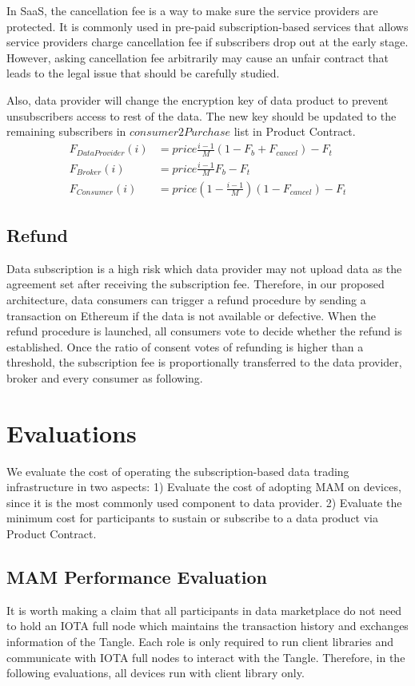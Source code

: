\documentclass[conference]{IEEEtran}
\begin{document}
In SaaS, the cancellation fee is a way to make sure the service providers are protected. It is commonly used in pre-paid subscription-based services that allows service providers charge cancellation fee if subscribers drop out at the early stage. However, asking cancellation fee arbitrarily may cause an unfair contract that leads to the legal issue that should be carefully studied.

Also, data provider will change the encryption key of data product to prevent unsubscribers access to rest of the data. The new key should be updated to the remaining subscribers in $consumer2Purchase$ list in Product Contract.
\begin{align}
\label{equation:unsubscribe}
    F_{DataProvider}(i) &= price \frac{i-1}{M} (1-F_{b}+F_{cancel}) -F_{t} \\
    F_{Broker}(i) &= price \frac{i-1}{M} F_{b} -F_{t} \\
    F_{Consumer}(i) &= price (1-\frac{i-1}{M})(1 -F_{cancel}) -F_{t}
\end{align}
\subsection{Refund}
\label{section:refund}
Data subscription is a high risk which data provider may not upload data as the agreement set after receiving the subscription fee. Therefore, in our proposed architecture, data consumers can trigger a refund procedure by sending a transaction on Ethereum if the data is not available or defective. When the refund procedure is launched, all consumers vote to decide whether the refund is established. Once the ratio of consent votes of refunding is higher than a threshold, the subscription fee is proportionally transferred to the data provider, broker and every consumer as following.

\section{Evaluations}
\label{section:evaluation}
We evaluate the cost of operating the subscription-based data trading infrastructure in two aspects: 1) Evaluate the cost of adopting MAM on devices, since it is the most commonly used component to data provider. 2) Evaluate the minimum cost for participants to sustain or subscribe to a data product via Product Contract.

\subsection{MAM Performance Evaluation}
\label{section:mam_performance}
It is worth making a claim that all participants in data marketplace do not need to hold an IOTA full node which maintains the transaction history and exchanges information of the Tangle. Each role is only required to run client libraries and communicate with IOTA full nodes to interact with the Tangle. Therefore, in the following evaluations, all devices run with client library only.
\end{document}
